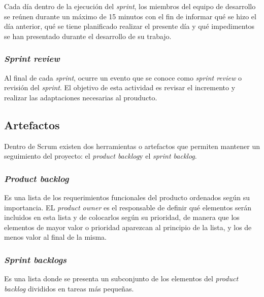 Cada día dentro de la ejecución del \textit{sprint}, los miembros del equipo de desarrollo se reúnen durante un máximo de 15 minutos con el fin de informar qué se hizo el día anterior, qué se tiene planificado realizar el presente día y qué impedimentos se han presentado durante el desarrollo de su trabajo.\cite{SCRM12}

\subsubsection{\textit{Sprint review}}

Al final de cada \textit{sprint}, ocurre un evento que se conoce como \textit{sprint review} o revisión del \textit{sprint}. El objetivo de esta actividad es revisar el incremento y realizar las adaptaciones necesarias al prouducto.\cite{SCRM12}

\subsection{Artefactos}

Dentro de Scrum existen dos herramientas o artefactos que permiten mantener un seguimiento del proyecto: el \textit{product backlog}y el \textit{sprint backlog}.\cite{SCRM2}

\subsubsection{\textit{Product backlog}}

Es una lista de los requerimientos funcionales del producto ordenados según su importancia. EL \textit{product owner} es el responsable de definir qué elementos serán incluidos en esta lista y de colocarlos según su prioridad, de manera que los elementos de mayor valor o prioridad aparezcan al principio de la lista, y los de menos valor al final de la misma. \cite{SCRM2}

\subsubsection{\textit{Sprint backlogs}}

Es una lista donde se presenta un subconjunto de los elementos del \textit{product backlog} divididos en tareas más pequeñas. \cite{SCRM2}


